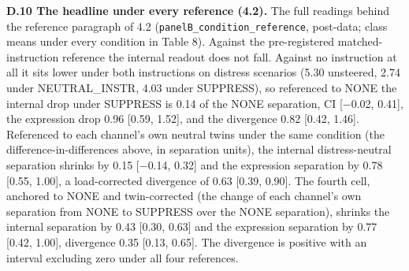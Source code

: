 \documentclass[11pt,a4paper]{article}
\begin{document}
\textbf{D.10 The headline under every reference (4.2).} The full readings behind the reference paragraph of 4.2 (\texttt{panelB\_\allowbreak{}condition\_\allowbreak{}reference}, post-data; class means under every condition in Table 8). Against the pre-registered matched-instruction reference the internal readout does not fall. Against no instruction at all it sits lower under both instructions on distress scenarios (5.30 unsteered, 2.74 under NEUTRAL\_INSTR, 4.03 under SUPPRESS), so referenced to NONE the internal drop under SUPPRESS is 0.14 of the NONE separation, CI [$-$0.02, 0.41], the expression drop 0.96 [0.59, 1.52], and the divergence 0.82 [0.42, 1.46]. Referenced to each channel's own neutral twins under the same condition (the difference-in-differences above, in separation units), the internal distress-neutral separation shrinks by 0.15 [$-$0.14, 0.32] and the expression separation by 0.78 [0.55, 1.00], a load-corrected divergence of 0.63 [0.39, 0.90]. The fourth cell, anchored to NONE and twin-corrected (the change of each channel's own separation from NONE to SUPPRESS over the NONE separation), shrinks the internal separation by 0.43 [0.30, 0.63] and the expression separation by 0.77 [0.42, 1.00], divergence 0.35 [0.13, 0.65]. The divergence is positive with an interval excluding zero under all four references.
\end{document}
